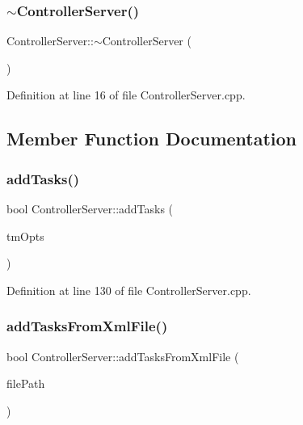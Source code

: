 \subsubsection{\texorpdfstring{$\sim$\+Controller\+Server()}{~ControllerServer()}}
{\footnotesize\ttfamily Controller\+Server\+::$\sim$\+Controller\+Server (\begin{DoxyParamCaption}{ }\end{DoxyParamCaption})\hspace{0.3cm}{\ttfamily [virtual]}}



Definition at line 16 of file Controller\+Server.\+cpp.



\subsection{Member Function Documentation}
\hypertarget{classocra__recipes_1_1ControllerServer_ad78efdf5d90308b0dc8e88d6d0720c5f}{}\label{classocra__recipes_1_1ControllerServer_ad78efdf5d90308b0dc8e88d6d0720c5f} 
\subsubsection{\texorpdfstring{add\+Tasks()}{addTasks()}}
{\footnotesize\ttfamily bool Controller\+Server\+::add\+Tasks (\begin{DoxyParamCaption}\item[{std\+::vector$<$ \hyperlink{classocra_1_1TaskBuilderOptions}{ocra\+::\+Task\+Builder\+Options} $>$ \&}]{tm\+Opts }\end{DoxyParamCaption})}



Definition at line 130 of file Controller\+Server.\+cpp.

\hypertarget{classocra__recipes_1_1ControllerServer_ad2ca7fafa8c7fff009581df869f65d85}{}\label{classocra__recipes_1_1ControllerServer_ad2ca7fafa8c7fff009581df869f65d85} 
\subsubsection{\texorpdfstring{add\+Tasks\+From\+Xml\+File()}{addTasksFromXmlFile()}}
{\footnotesize\ttfamily bool Controller\+Server\+::add\+Tasks\+From\+Xml\+File (\begin{DoxyParamCaption}\item[{const std\+::string \&}]{file\+Path }\end{DoxyParamCaption})}



